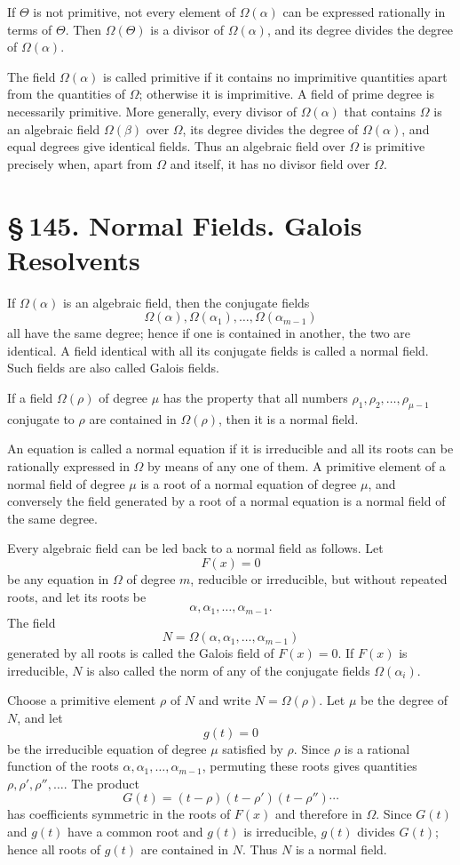 \documentclass[11pt]{article}
\providecommand{\sect}[2]{\section*{\S\,#1. #2}}
\begin{document}
If $\Theta$ is not primitive, not every element of $\Omega(\alpha)$ can be expressed rationally in terms of $\Theta$. Then $\Omega(\Theta)$ is a divisor of $\Omega(\alpha)$, and its degree divides the degree of $\Omega(\alpha)$.

The field $\Omega(\alpha)$ is called primitive if it contains no imprimitive quantities apart from the quantities of $\Omega$; otherwise it is imprimitive. A field of prime degree is necessarily primitive. More generally, every divisor of $\Omega(\alpha)$ that contains $\Omega$ is an algebraic field $\Omega(\beta)$ over $\Omega$, its degree divides the degree of $\Omega(\alpha)$, and equal degrees give identical fields. Thus an algebraic field over $\Omega$ is primitive precisely when, apart from $\Omega$ and itself, it has no divisor field over $\Omega$.

\sect{145}{Normal Fields. Galois Resolvents}

If $\Omega(\alpha)$ is an algebraic field, then the conjugate fields
\[
        \Omega(\alpha),\Omega(\alpha_1),\ldots,\Omega(\alpha_{m-1})
\]
all have the same degree; hence if one is contained in another, the two are identical. A field identical with all its conjugate fields is called a normal field. Such fields are also called Galois fields.

If a field $\Omega(\rho)$ of degree $\mu$ has the property that all numbers $\rho_1,\rho_2,\ldots,\rho_{\mu-1}$ conjugate to $\rho$ are contained in $\Omega(\rho)$, then it is a normal field.

An equation is called a normal equation if it is irreducible and all its roots can be rationally expressed in $\Omega$ by means of any one of them. A primitive element of a normal field of degree $\mu$ is a root of a normal equation of degree $\mu$, and conversely the field generated by a root of a normal equation is a normal field of the same degree.

Every algebraic field can be led back to a normal field as follows. Let
\[
\tag{1}
        F(x)=0
\]
be any equation in $\Omega$ of degree $m$, reducible or irreducible, but without repeated roots, and let its roots be
\[
\tag{2}
        \alpha,\alpha_1,\ldots,\alpha_{m-1}.
\]
The field
\[
\tag{4}
        N=\Omega(\alpha,\alpha_1,\ldots,\alpha_{m-1})
\]
generated by all roots is called the Galois field of $F(x)=0$. If $F(x)$ is irreducible, $N$ is also called the norm of any of the conjugate fields $\Omega(\alpha_i)$.

Choose a primitive element $\rho$ of $N$ and write $N=\Omega(\rho)$. Let $\mu$ be the degree of $N$, and let
\[
\tag{5}
        g(t)=0
\]
be the irreducible equation of degree $\mu$ satisfied by $\rho$. Since $\rho$ is a rational function of the roots $\alpha,\alpha_1,\ldots,\alpha_{m-1}$, permuting these roots gives quantities $\rho,\rho',\rho'',\ldots$. The product
\[
        G(t)=(t-\rho)(t-\rho')(t-\rho'')\cdots
\]
has coefficients symmetric in the roots of $F(x)$ and therefore in $\Omega$. Since $G(t)$ and $g(t)$ have a common root and $g(t)$ is irreducible, $g(t)$ divides $G(t)$; hence all roots of $g(t)$ are contained in $N$. Thus $N$ is a normal field.
\end{document}
